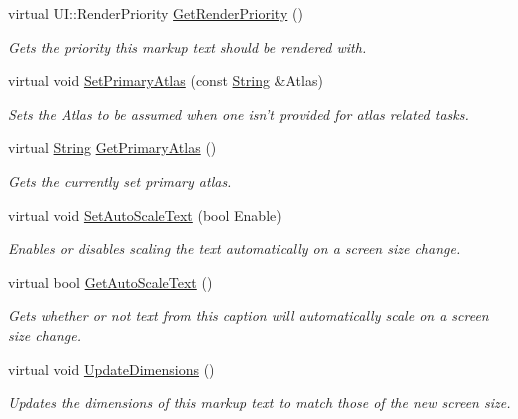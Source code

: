 \begin{DoxyCompactItemize}
virtual UI::RenderPriority \hyperlink{classphys_1_1UI_1_1MarkupText_a86afb23309534d86ed9675170b321874}{GetRenderPriority} ()
\begin{DoxyCompactList}\small\item\em Gets the priority this markup text should be rendered with. \item\end{DoxyCompactList}\item 
virtual void \hyperlink{classphys_1_1UI_1_1MarkupText_a354219ee5ad95b4eb6bd83cadbab6a69}{SetPrimaryAtlas} (const \hyperlink{namespacephys_aa03900411993de7fbfec4789bc1d392e}{String} \&Atlas)
\begin{DoxyCompactList}\small\item\em Sets the Atlas to be assumed when one isn't provided for atlas related tasks. \item\end{DoxyCompactList}\item 
virtual \hyperlink{namespacephys_aa03900411993de7fbfec4789bc1d392e}{String} \hyperlink{classphys_1_1UI_1_1MarkupText_ac7773396203de98705ea7b138908028e}{GetPrimaryAtlas} ()
\begin{DoxyCompactList}\small\item\em Gets the currently set primary atlas. \item\end{DoxyCompactList}\item 
virtual void \hyperlink{classphys_1_1UI_1_1MarkupText_a860efc65536fbaf274fc64e26881b84b}{SetAutoScaleText} (bool Enable)
\begin{DoxyCompactList}\small\item\em Enables or disables scaling the text automatically on a screen size change. \item\end{DoxyCompactList}\item 
virtual bool \hyperlink{classphys_1_1UI_1_1MarkupText_a0fd8fa24b2e3a40f6fe3a8314c8e489f}{GetAutoScaleText} ()
\begin{DoxyCompactList}\small\item\em Gets whether or not text from this caption will automatically scale on a screen size change. \item\end{DoxyCompactList}\item 
virtual void \hyperlink{classphys_1_1UI_1_1MarkupText_af66aa4c6c09ba9714f2ae3afaeeb2527}{UpdateDimensions} ()
\begin{DoxyCompactList}\small\item\em Updates the dimensions of this markup text to match those of the new screen size. \item\end{DoxyCompactList}\end{DoxyCompactItemize}
